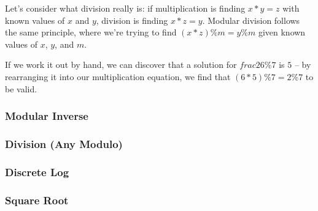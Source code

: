 Let's consider what division really is: if multiplication is finding $x * y = z$ with known values of $x$ and $y$, division is finding $x * z = y$. Modular division follows the same principle, where we're trying to find $(x * z) \% m = y \% m$ given known values of $x$, $y$, and $m$.

If we work it out by hand, we can discover that a solution for $frac{2}{6} \% 7$ is $5$ -- by rearranging it into our multiplication equation, we find that $(6 * 5) \% 7 = 2 \% 7$ to be valid.

\subsubsection{Modular Inverse}

\subsubsection{Division (Any Modulo)}

\subsubsection{Discrete Log}

\subsubsection{Square Root}
